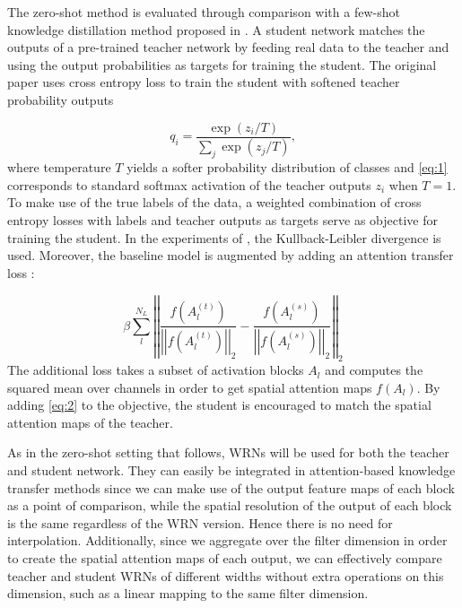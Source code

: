 The zero-shot method is evaluated through comparison with a few-shot knowledge distillation method proposed in \cite{hinton2015distilling}. A student network matches the outputs of a pre-trained teacher network by feeding real data to the teacher and using the output probabilities as targets for training the student. The original paper uses cross entropy loss to train the student with softened teacher probability outputs

\useshortskip
\begin{equation}
    q_i = \frac{\exp(z_i/T)}{\sum_j\exp(z_j/T)},\label{eq:1}
\end{equation}
\useshortskip
where temperature $T$ yields a softer probability distribution of classes and \eqref{eq:1} corresponds to standard softmax activation of the teacher outputs $z_i$ when $T=1$. To make use of the true labels of the data, a weighted combination of cross entropy losses with labels and teacher outputs as targets serve as objective for training the student. In the experiments of \cite{Micaelli2019ZeroShotKT}, the Kullback-Leibler divergence is used. Moreover, the baseline model is augmented by adding an attention transfer loss \cite{zagoruyko2016paying}:

\useshortskip
\begin{equation}
    \beta\sum_l^{N_L}\left\lvert\left\lvert\frac{f(A_l^{(t)})}{\left\lvert\left\lvert f(A_l^{(t)})\right\rvert\right\rvert_2}-\frac{f(A_l^{(s)})}{\left\lvert\left\lvert f(A_l^{(s)})\right\rvert\right\rvert_2}\right\rvert\right\rvert_2\label{eq:2}
\end{equation}
\useshortskip
The additional loss takes a subset of activation blocks $A_l$ and computes the squared mean over channels in order to get spatial attention maps $f(A_l)$. By adding \eqref{eq:2} to the objective, the student is encouraged to match the spatial attention maps of the teacher. 

As in the zero-shot setting that follows, WRNs will be used for both the teacher and student network. They can easily be integrated in attention-based knowledge transfer methods since we can make use of the output feature maps of each block as a point of comparison, while the spatial resolution of the output of each block is the same regardless of the WRN version. Hence there is no need for interpolation. Additionally, since we aggregate over the filter dimension in order to create the spatial attention maps of each output, we can effectively compare teacher and student WRNs of different widths without extra operations on this dimension, such as a linear mapping to the same filter dimension. 

